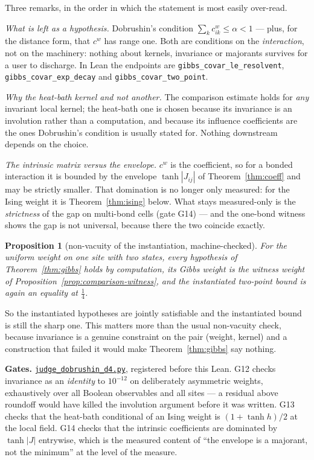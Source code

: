\documentclass[11pt]{article}
\newtheorem{proposition}[theorem]{Proposition}
\theoremstyle{definition}
\newcommand{\anchor}{c7b870b05bd6d1bec270d499e1358a64070ce0e1}
\newcommand{\repofile}[2]{%
  \href{https://github.com/lluiseriksson/THE-ERIKSSON-PROGRAMME/blob/\anchor/#1}{\nolinkurl{#2}}}
\begin{document}
Three remarks, in the order in which the statement is most easily over-read.

\emph{What is left as a hypothesis.}
Dobrushin's condition $\sum_k c^w_{ik}\le\alpha<1$ --- plus, for the distance
form, that $c^w$ has range one.  Both are conditions on the \emph{interaction},
not on the machinery: nothing about kernels, invariance or majorants survives
for a user to discharge.  In Lean the endpoints are
\texttt{gibbs\_covar\_le\_resolvent}, \texttt{gibbs\_covar\_exp\_decay} and
\texttt{gibbs\_covar\_two\_point}.

\emph{Why the heat-bath kernel and not another.}  The comparison estimate holds
for \emph{any} invariant local kernel; the heat-bath one is chosen because its
invariance is an involution rather than a computation, and because its
influence coefficients are the ones Dobrushin's condition is usually stated
for.  Nothing downstream depends on the choice.

\emph{The intrinsic matrix versus the envelope.}  $c^w$ is the coefficient, so
for a bonded interaction it is bounded by the envelope $\tanh|J_{ij}|$ of
Theorem~\ref{thm:coeff} and may be strictly smaller.  That domination is no
longer only measured: for the Ising weight it is Theorem~\ref{thm:ising}
below.  What stays measured-only is the \emph{strictness} of the gap on
multi-bond cells (gate G14) --- and the one-bond witness shows the gap is not
universal, because there the two coincide exactly.

\begin{proposition}[non-vacuity of the instantiation, machine-checked]
\label{prop:gibbs-witness}
For the uniform weight on one site with two states, every hypothesis of
Theorem~\ref{thm:gibbs} holds by computation, its Gibbs weight \emph{is} the
witness weight of Proposition~\ref{prop:comparison-witness}, and the
instantiated two-point bound is again an equality at $\tfrac14$.
\end{proposition}

So the instantiated hypotheses are jointly satisfiable and the instantiated
bound is still the sharp one.  This matters more than the usual non-vacuity
check, because invariance is a genuine constraint on the pair (weight,
kernel) and a construction that failed it would make Theorem~\ref{thm:gibbs}
say nothing.

\textbf{Gates.}  \repofile{scripts/judge\_dobrushin\_d4.py}{judge\_dobrushin\_d4.py},
registered before this Lean.  G12 checks invariance as an \emph{identity} to
$10^{-12}$ on deliberately asymmetric weights, exhaustively over all Boolean
observables and all sites --- a residual above roundoff would have killed the
involution argument before it was written.  G13 checks that the heat-bath
conditional of an Ising weight is $(1+\tanh h)/2$ at the local field.  G14
checks that the intrinsic coefficients are dominated by $\tanh|J|$ entrywise,
which is the measured content of ``the envelope is a majorant, not the
minimum'' at the level of the measure.
\end{document}
